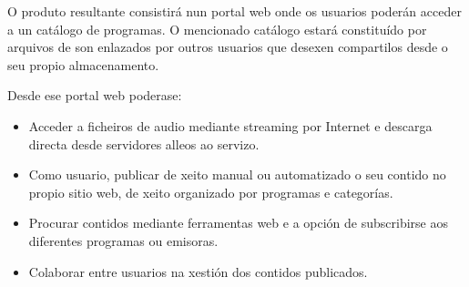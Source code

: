 O produto resultante consistirá nun portal web onde os usuarios poderán acceder a un catálogo de programas. O mencionado catálogo estará constituído por arquivos de son enlazados por outros usuarios que desexen compartilos desde o seu propio almacenamento.

Desde ese portal web poderase:
\begin{itemize}
\item Acceder a ficheiros de audio mediante streaming por Internet e descarga directa desde servidores alleos ao servizo.
\item Como usuario, publicar de xeito manual ou automatizado o seu contido no propio sitio web, de xeito organizado por programas e categorías. 
\item Procurar contidos mediante ferramentas web e a opción de subscribirse aos diferentes programas ou emisoras.
\item Colaborar entre usuarios na xestión dos contidos publicados.
\end{itemize}

